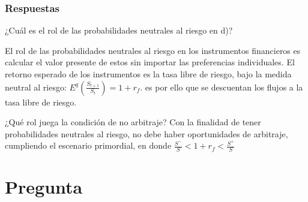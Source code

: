 \documentclass{beamer}
\newif\ifpresentacion
\newcommand{\pausa}{\ifpresentacion\pause\fi}
\begin{document}
\begin{frame}
  \frametitle{Respuestas }
  \begin{block}{¿Cuál es el rol de las probabilidades neutrales al riesgo en d)?}
    \pausa
    El rol de las probabilidades neutrales al riesgo en los instrumentos financieros
    es calcular el valor presente de estos sin importar las preferencias individuales.
    El retorno esperado de los instrumentos es la tasa libre de riesgo, bajo la medida neutral al riesgo: 
    \( E^q\left(\frac{S_{t+1}}{S_t}\right)=1 +r_f \). es por ello que se descuentan los flujos a la tasa libre de riesgo.

    \end{block}
  \pausa
  \begin{block}{¿Qué rol juega la condición de no arbitraje?}
    Con la finalidad de tener probabilidades neutrales al riesgo, no debe haber oportunidades de arbitraje, 
    cumpliendo el escenario primordial, en  donde \( \frac{S^-}{S} < 1 + r_f < \frac{S^+}{S}\)
  \end{block}
\end{frame}

\section{Pregunta }
\end{document}

